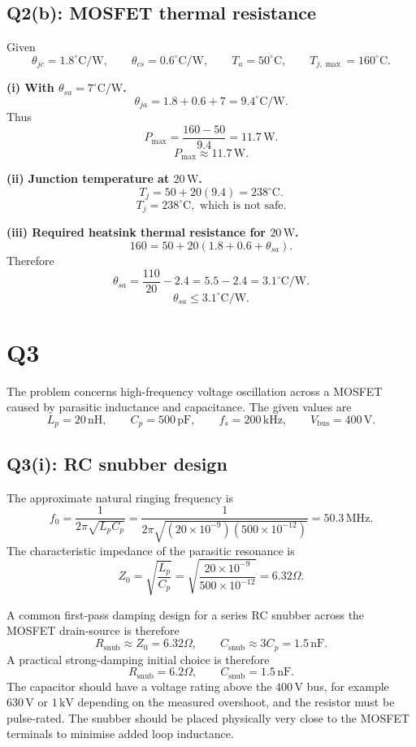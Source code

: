 \documentclass[11pt,a4paper]{article}
\newcommand{\unit}[1]{\,\mathrm{#1}}
\newcommand{\answerbox}[1]{\[\boxed{#1}\]}
\begin{document}
\subsection*{Q2(b): MOSFET thermal resistance}

Given
\[
\theta_{jc}=1.8^\circ\mathrm{C/W},\qquad
\theta_{cs}=0.6^\circ\mathrm{C/W},\qquad
T_a=50^\circ\mathrm{C},\qquad
T_{j,\max}=160^\circ\mathrm{C}.
\]

\textbf{(i) With $\theta_{sa}=7^\circ\mathrm{C/W}$.}
\[
\theta_{ja}=1.8+0.6+7=9.4^\circ\mathrm{C/W}.
\]
Thus
\[
P_{\max}=\frac{160-50}{9.4}=11.7\unit{W}.
\]
\answerbox{P_{\max}\approx 11.7\unit{W}.}

\textbf{(ii) Junction temperature at $20\unit{W}$.}
\[
T_j=50+20(9.4)=238^\circ\mathrm{C}.
\]
\answerbox{T_j=238^\circ\mathrm{C},\text{ which is not safe.}}

\textbf{(iii) Required heatsink thermal resistance for $20\unit{W}$.}
\[
160=50+20(1.8+0.6+\theta_{sa}).
\]
Therefore
\[
\theta_{sa}=\frac{110}{20}-2.4=5.5-2.4=3.1^\circ\mathrm{C/W}.
\]
\answerbox{\theta_{sa}\le 3.1^\circ\mathrm{C/W}.}

\newpage
\section*{Q3}

The problem concerns high-frequency voltage oscillation across a MOSFET caused by parasitic inductance and capacitance. The given values are
\[
L_p=20\unit{nH},\qquad C_p=500\unit{pF},\qquad f_s=200\unit{kHz},\qquad V_{\mathrm{bus}}=400\unit{V}.
\]

\subsection*{Q3(i): RC snubber design}

The approximate natural ringing frequency is
\[
f_0=\frac{1}{2\pi\sqrt{L_pC_p}}
=\frac{1}{2\pi\sqrt{(20\times10^{-9})(500\times10^{-12})}}
=50.3\unit{MHz}.
\]
The characteristic impedance of the parasitic resonance is
\[
Z_0=\sqrt{\frac{L_p}{C_p}}
=\sqrt{\frac{20\times10^{-9}}{500\times10^{-12}}}
=6.32\Omega.
\]

A common first-pass damping design for a series RC snubber across the MOSFET drain-source is therefore
\[
R_{\mathrm{snub}}\approx Z_0=6.32\Omega,
\qquad
C_{\mathrm{snub}}\approx 3C_p=1.5\unit{nF}.
\]
A practical strong-damping initial choice is therefore
\answerbox{R_{\mathrm{snub}}=6.2\Omega,\qquad C_{\mathrm{snub}}=1.5\unit{nF}.}
The capacitor should have a voltage rating above the $400\unit{V}$ bus, for example $630\unit{V}$ or $1\unit{kV}$ depending on the measured overshoot, and the resistor must be pulse-rated. The snubber should be placed physically very close to the MOSFET terminals to minimise added loop inductance.
\end{document}
